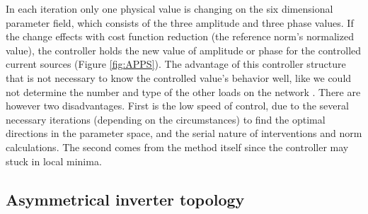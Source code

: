         In each iteration only one physical value is changing on the six dimensional parameter field, which consists of the three amplitude and three phase values. If the change effects with cost function reduction (the reference norm's normalized value), the controller holds the new value of amplitude or phase for the controlled current sources (Figure \ref{fig:APPS}). The advantage of this controller structure that is not necessary to know the controlled value's behavior well, like we could not determine the number and type of the other loads on the network \cite{Neukirchner2015}. There are however two disadvantages. First is the low speed of control, due to the several necessary iterations (depending on the circumstances) to find the optimal directions in the parameter space, and the serial nature of interventions and norm calculations. The second comes from the method itself since the controller may stuck in local minima.

    \subsection{Asymmetrical inverter topology}\label{VUB:sec:Inverter}

